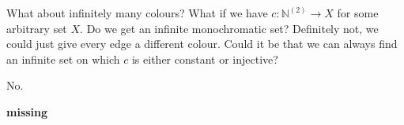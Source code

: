 \documentclass{article}
\begin{document}
What about infinitely many colours? What if we have $c: \mathbb{N}^{(2)} \to X$ for some arbitrary set $X$.
Do we get an infinite monochromatic set? Definitely not, we could just give every edge a different colour.
Could it be that we can always find an infinite set on which $c$ is either constant or injective?

\begin{center}
\end{center}
No.

\newlec
\textbf{missing}
\end{document}
